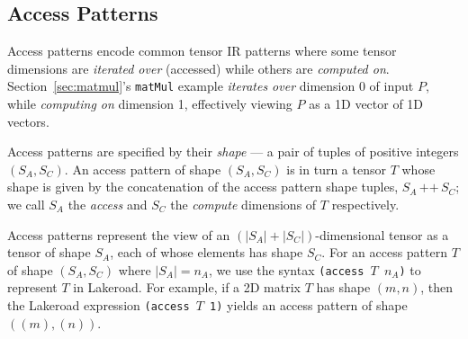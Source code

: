 \documentclass[prologue, dvipsnames, sigplan, screen, review, anonymous]{acmart}
\newcommand{\g}{Lakeroad\xspace}
\newcommand{\accesspatternshape}[2]{$($$\left( #1 \right)$, $\left( #2 \right)$$)$}
\newcommand{\tcd}[1]{\texttt{#1}}
\newcommand{\mcd}[1]{\mathrm{\tcd{#1}}}
\begin{document}
\subsection{Access Patterns}


Access patterns encode common
  tensor IR patterns where
  some tensor dimensions
  are \textit{iterated over} (accessed)
  while others are \textit{computed on}.
Section~\ref{sec:matmul}'s \tcd{matMul} example
  \textit{iterates over} dimension 0 of input $P$,
  while \textit{computing on} dimension 1,
  effectively viewing $P$ as a 1D vector of 1D vectors.

Access patterns are specified by their \textit{shape} ---
  a pair of tuples of positive integers $(S_A, S_C)$.
An access pattern of shape $(S_A, S_C)$ is in turn a
  tensor $T$ whose shape is given by the
  concatenation of the access pattern shape tuples,
  $S_A \,\mcd{++}\, S_C$; we call
  $S_A$ the \textit{access} and
  $S_C$ the \textit{compute}
  dimensions of $T$ respectively.

Access patterns represent the view of an
  $(|S_A| + |S_C|)$-dimensional tensor
  as a tensor of shape $S_A$,
  each of whose elements has shape $S_C$.
For an access pattern $T$ of shape $(S_A, S_C)$
  where $|S_A| = n_A$, we use the syntax
  \tcd{(access $T$ $n_A$)} to represent $T$ in \g.
For example, if a 2D matrix $T$ has shape $(m, n)$,
  then the \g expression \tcd{(access $T$ 1)}
  yields an access pattern of shape $((m), (n))$.
  

  
\end{document}
